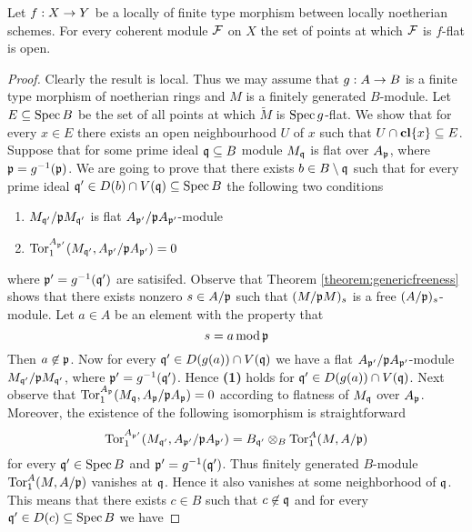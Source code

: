 \begin{theorem}\label{theorem:openessofflatlocus}
Let $f:X\rightarrow Y$ be a locally of finite type morphism between locally noetherian schemes. For every coherent module ${\mathcal F}$ on $X$ the set of points at which ${\mathcal F}$ is $f$-flat is open.
\end{theorem}
\begin{proof}
Clearly the result is local. Thus we may assume that $g:A\rightarrow B$ is a finite type morphism of noetherian rings and $M$ is a finitely generated $B$-module. Let $E\subseteq \mathrm{Spec}\, B$ be the set of all points at which $\widetilde{M}$ is $\mathrm{Spec}\, g$-flat. We show that for every $x\in E$ there exists an open neighbourhood $U$ of $x$ such that $U\cap \mathbf{cl}\{x\}\subseteq E$. Suppose that for some prime ideal $\mathfrak{q}\subseteq B$ module $M_{\mathfrak{q}}$ is flat over $A_{\mathfrak{p}}$, where $\mathfrak{p}=g^{-1}(\mathfrak{p})$. We are going to prove that there exists $b\in B\setminus \mathfrak{q}$ such that for every prime ideal $\mathfrak{q}'\in D(b)\cap V(\mathfrak{q})\subseteq \mathrm{Spec}\, B$ the following two conditions
\begin{enumerate}[label=\textbf{(\arabic*)}, leftmargin=*]
\item $M_{\mathfrak{q}'}/\mathfrak{p}M_{\mathfrak{q}'}$ is flat $A_{\mathfrak{p}'}/\mathfrak{p}A_{\mathfrak{p}'}$-module
\item $\mathrm{Tor}^{A_{\mathfrak{p}'}}_1(M_{\mathfrak{q}'},A_{\mathfrak{p}'}/\mathfrak{p}A_{\mathfrak{p}'})=0$
\end{enumerate}
where $\mathfrak{p}'=g^{-1}(\mathfrak{q}')$ are satisifed.
Observe that Theorem \ref{theorem:genericfreeness} shows that there exists nonzero $s\in A/\mathfrak{p}$ such that $(M/\mathfrak{p}M)_s$ is a free $(A/\mathfrak{p})_s$-module. Let $a\in A$ be an element with the property that
$$s=a\,\mathrm{mod}\,\mathfrak{p}$$
Then $a\not \in \mathfrak{p}$. Now for every $\mathfrak{q}'\in D(g(a))\cap V(\mathfrak{q})$ we have a flat $A_{\mathfrak{p}'}/\mathfrak{p}A_{\mathfrak{p}'}$-module $M_{\mathfrak{q}'}/\mathfrak{p}M_{\mathfrak{q}'}$, where $\mathfrak{p}'=g^{-1}(\mathfrak{q}')$. Hence \textbf{(1)} holds for $\mathfrak{q}'\in D(g(a))\cap V(\mathfrak{q})$. Next observe that $\mathrm{Tor}^{A_{\mathfrak{p}}}_1(M_{\mathfrak{q}},A_{\mathfrak{p}}/\mathfrak{p}A_{\mathfrak{p}})=0$ according to flatness of $M_{\mathfrak{q}}$ over $A_{\mathfrak{p}}$. Moreover, the existence of the following isomorphism is straightforward
$$\mathrm{Tor}_1^{A_{\mathfrak{p}'}}(M_{\mathfrak{q}'},A_{\mathfrak{p}'}/\mathfrak{p}A_{\mathfrak{p}'})=B_{\mathfrak{q}'}\otimes _B\mathrm{Tor}_1^A(M,A/\mathfrak{p})$$
for every $\mathfrak{q}'\in \mathrm{Spec}\, B$ and $\mathfrak{p}'=g^{-1}(\mathfrak{q}')$. Thus finitely generated $B$-module $\mathrm{Tor}^A_1(M,A/\mathfrak{p})$ vanishes at $\mathfrak{q}$. Hence it also vanishes at some neighborhood of $\mathfrak{q}$. This means that there exists $c\in B$ such that $c\not \in \mathfrak{q}$ and for every $\mathfrak{q}'\in D(c)\subseteq \mathrm{Spec}\, B$ we have

\end{proof}
